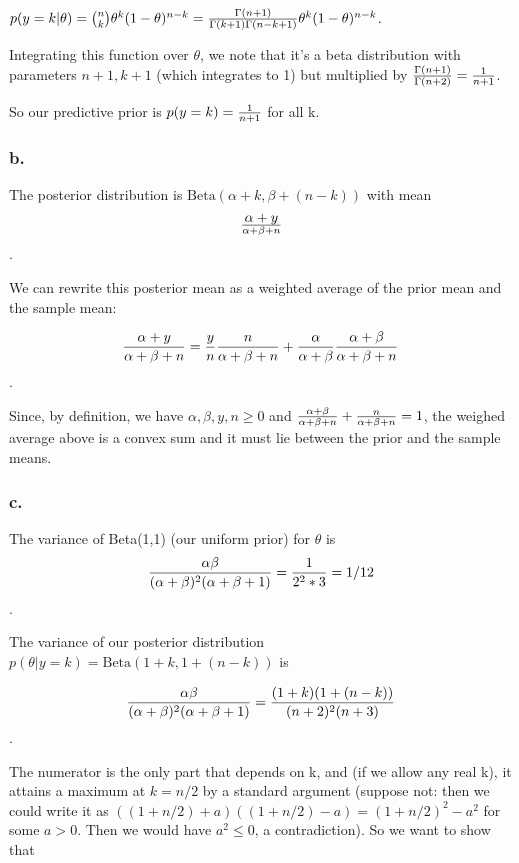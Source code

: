 \documentclass{article}
\begin{document}
\(p(y=k \vert \theta) = {n \choose k} \theta^{k}(1 - \theta)^{n-k} = {\Gamma(n + 1) \over \Gamma(k + 1) \Gamma(n - k +1)} \theta^{k}(1 - \theta)^{n-k} \).

Integrating this function over \(\theta\), we note that it's a beta distribution with parameters \(n + 1, k + 1\) (which integrates to 1) 
but multiplied by \({\Gamma(n + 1) \over \Gamma (n + 2)} = {1 \over n + 1}\).

So  our predictive prior is \(p(y = k) = {1 \over n + 1}\) for all k.

\subsubsection{b.}

The posterior distribution is 
\(\text{Beta}(\alpha + k, \beta + (n - k))\) with mean \[\alpha + y \over \alpha + \beta + n\].

We can rewrite this posterior mean as a weighted average of the prior mean and the sample mean:

\[{\alpha + y \over \alpha + \beta + n} = {y \over n}{n \over \alpha + \beta + n} + {\alpha \over \alpha + \beta}{\alpha + \beta \over \alpha + \beta + n}\].

Since, by definition, we have \(\alpha, \beta, y, n \geq 0\) and \({\alpha + \beta \over \alpha + \beta + n} + {n \over \alpha + \beta + n} = 1\),
the weighed average above is a convex sum and it must lie between the prior and the sample means.

\subsubsection{c.}

The variance of Beta(1,1) (our uniform prior) for \(\theta\) is \[{\alpha\beta \over (\alpha + \beta)^2(\alpha + \beta + 1)} = {1 \over 2^2 * 3} = 1/12\].

The variance of our posterior distribution \(p(\theta \vert y = k) = \text{Beta}(1 + k, 1 + (n - k))\) is

\[{\alpha\beta \over (\alpha + \beta)^2(\alpha + \beta + 1)} = {(1 + k) (1 + (n - k)) \over (n+2)^2 (n+3)}\].

The numerator is the only part that depends on k, and (if we allow any real k),
it attains a maximum at \(k = n/2\) by a 
standard argument (suppose not: then we could write it as \( ((1 + n/2) + a)((1 + n/2) - a) = (1 + n/2)^2 - a^2\)
for some \(a > 0\). Then we would have \(a^2 \leq 0\), a contradiction). So we want to show that
\end{document}
